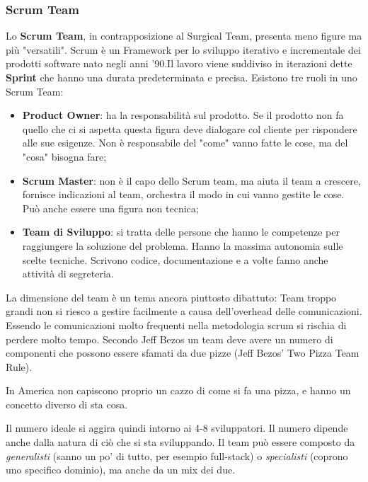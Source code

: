 \subsubsection{Scrum Team}
Lo \textbf{Scrum Team}, in contrapposizione al Surgical Team, presenta meno figure ma più "versatili". Scrum è un Framework per lo sviluppo iterativo e incrementale dei prodotti software nato negli anni '90.\newline Il lavoro viene suddiviso in iterazioni dette \textbf{Sprint} che hanno una durata predeterminata e precisa. Esistono tre ruoli in uno Scrum Team:
\begin{itemize}
	\item \textbf{Product Owner}: ha la responsabilità sul prodotto. Se il prodotto non fa quello che ci si aspetta questa figura deve dialogare col cliente per rispondere alle sue esigenze. Non è responsabile del "come" vanno fatte le cose, ma del "cosa" bisogna fare;
	\item \textbf{Scrum Master}: non è il capo dello Scrum team, ma aiuta il team a crescere, fornisce indicazioni al team, orchestra il modo in cui vanno gestite le cose. Può anche essere una figura non tecnica;
	\item \textbf{Team di Sviluppo}: si tratta delle persone che hanno le competenze per raggiungere la soluzione del problema. Hanno la massima autonomia sulle scelte tecniche. Scrivono codice, documentazione e a volte fanno anche attività di segreteria.
\end{itemize}
La dimensione del team è un tema ancora piuttosto dibattuto:
Team troppo grandi non si riesco a gestire facilmente a causa dell'overhead delle comunicazioni. Essendo le comunicazioni molto frequenti nella metodologia scrum si rischia di perdere molto tempo.
Secondo Jeff Bezos un team deve avere un numero di componenti che possono essere sfamati da due pizze (Jeff Bezos' Two Pizza Team Rule).
\begin{warn}
	In America non capiscono proprio un cazzo di come si fa una pizza, e hanno un concetto diverso di sta cosa.
\end{warn}
Il numero ideale si aggira quindi intorno ai 4-8 sviluppatori. Il numero dipende anche dalla natura di ciò che si sta sviluppando. Il team può essere composto da \textit{generalisti} (sanno un po' di tutto, per esempio full-stack) o \textit{specialisti} (coprono uno specifico dominio), ma anche da un mix dei due.\newline
